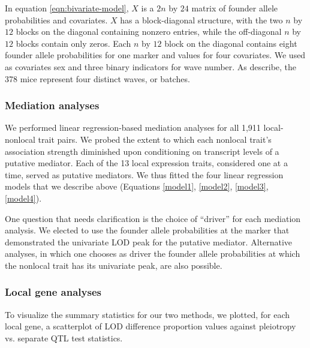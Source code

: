 \documentclass{article}
\begin{document}
In equation \ref{eqn:bivariate-model}, $X$ is a $2n$ by $24$ matrix of founder allele probabilities and covariates. $X$ has a block-diagonal structure, with the two $n$ by $12$ blocks on the diagonal containing nonzero entries, while the off-diagonal $n$ by $12$ blocks contain only zeros. Each $n$ by $12$ block on the diagonal contains eight founder allele probabilities for one marker and values for four covariates. We used as covariates sex and three binary indicators for wave number. As \citet{keller2018genetic} describe, the 378 mice represent four distinct waves, or batches.

\subsubsection{Mediation analyses}

We performed linear regression-based mediation analyses for all 1,911 local-nonlocal trait pairs. We probed the extent to which each nonlocal trait's association strength diminished upon conditioning on transcript levels of a putative mediator. Each of the 13 local expression traits, considered one at a time, served as putative mediators. We thus fitted the four linear regression models that we describe above (Equations \ref{model1}, \ref{model2}, \ref{model3}, \ref{model4}). 

One question that needs clarification is the choice of ``driver'' for each mediation analysis. We elected to use the founder allele probabilities at the marker that demonstrated the univariate LOD peak for the putative mediator. Alternative analyses, in which one chooses as driver the founder allele probabilities at which the nonlocal trait has its univariate peak, are also possible.



\subsubsection{Local gene analyses}

To visualize the summary statistics for our two methods, we plotted, for each local gene, a scatterplot of LOD difference proportion values against pleiotropy vs. separate QTL test statistics. 
\end{document}
